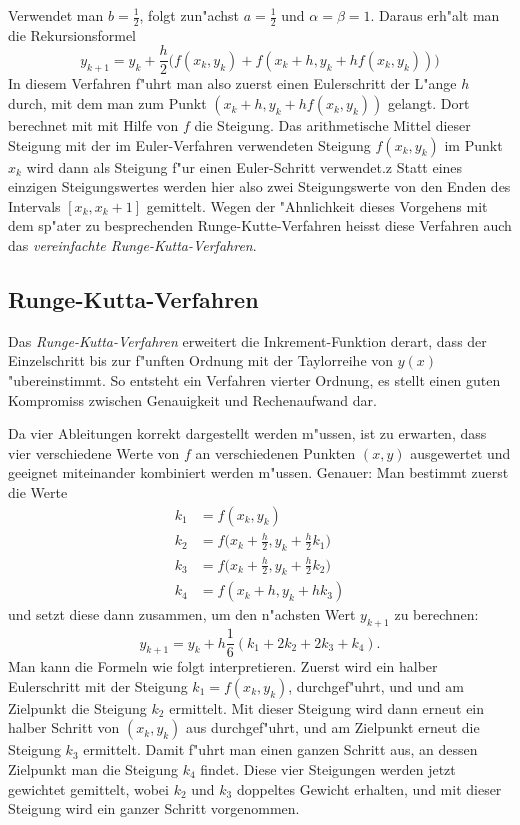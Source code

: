 Verwendet man $b=\frac12$, folgt zun"achst $a=\frac12$ und $\alpha=\beta=1$.
Daraus erh"alt man die Rekursionsformel
\begin{equation}
y_{k+1}=y_k+\frac{h}2\biggl(
f(x_k,y_k) + f(x_k+h, y_k + hf(x_k,y_k))
\biggr)
\label{numerik:simplified-runge-kutta}
\end{equation}
In diesem Verfahren f"uhrt man also zuerst einen Eulerschritt der L"ange
$h$ durch, mit dem man zum Punkt $(x_k+h, y_k+hf(x_k,y_k))$ gelangt.
Dort berechnet mit mit Hilfe von $f$ die Steigung.
Das arithmetische Mittel dieser Steigung mit der im Euler-Verfahren
verwendeten Steigung $f(x_k,y_k)$ im Punkt $x_k$ wird dann als
Steigung f"ur einen Euler-Schritt verwendet.z
Statt eines einzigen Steigungswertes werden hier also zwei Steigungswerte
von den Enden des Intervals $[x_k,x_k+1]$ gemittelt.
Wegen der "Ahnlichkeit dieses Vorgehens mit dem sp"ater zu besprechenden
Runge-Kutte-Verfahren heisst diese Verfahren auch das {\em
vereinfachte Runge-Kutta-Verfahren}.

\subsection{Runge-Kutta-Verfahren}
Das {\em Runge-Kutta-Verfahren} erweitert die Inkrement-Funktion derart,
dass der Einzelschritt bis zur f"unften Ordnung mit der Taylorreihe von
$y(x)$ "ubereinstimmt.
So entsteht ein Verfahren vierter Ordnung, es stellt einen guten Kompromiss
zwischen Genauigkeit und Rechenaufwand dar.

Da vier Ableitungen korrekt dargestellt werden m"ussen, ist zu erwarten,
dass vier verschiedene Werte von $f$ an verschiedenen Punkten $(x,y)$
ausgewertet und geeignet miteinander kombiniert werden m"ussen.
Genauer: Man bestimmt zuerst die Werte
\begin{align*}
k_1&=f(x_k,y_k)\\
k_2&=f\biggl(x_k+\frac{h}2,y_k+\frac{h}2k_1\biggr)\\
k_3&=f\biggl(x_k+\frac{h}2,y_k+\frac{h}2k_2\biggr)\\
k_4&=f(x_k+h, y_k+hk_3)
\end{align*}
und setzt diese dann zusammen, um den n"achsten Wert $y_{k+1}$
zu berechnen:
\begin{equation}
y_{k+1} = y_k + h\frac{1}6(k_1 + 2k_2 + 2k_3 + k_4).
\label{numerik:runge-kutta-rekursion}
\end{equation}
Man kann die Formeln wie folgt interpretieren.
Zuerst wird ein halber Eulerschritt mit der Steigung $k_1=f(x_k,y_k)$,
durchgef"uhrt, und und am Zielpunkt die Steigung $k_2$ ermittelt.
Mit dieser Steigung wird dann erneut ein halber Schritt von $(x_k,y_k)$
aus durchgef"uhrt, und am Zielpunkt erneut die Steigung $k_3$ ermittelt.
Damit f"uhrt man einen ganzen Schritt aus, an dessen Zielpunkt man die
Steigung $k_4$ findet.
Diese vier Steigungen werden jetzt gewichtet gemittelt, wobei
$k_2$ und $k_3$ doppeltes Gewicht erhalten, und mit dieser
Steigung wird ein ganzer Schritt vorgenommen.

